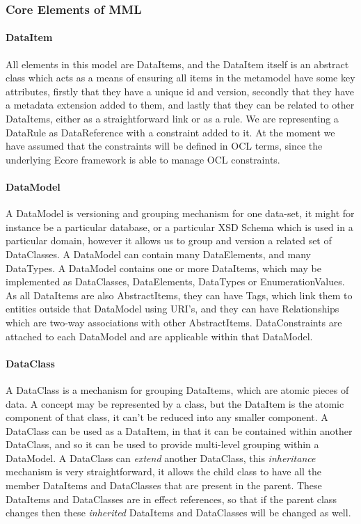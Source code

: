 \documentclass{llncs}
\begin{document}
	\subsubsection{Core Elements of MML}
	
	\paragraph{DataItem}
	All elements in this model are DataItems, and the DataItem itself is an abstract class which acts as a means of ensuring all items in the metamodel have some key attributes, firstly that they have a unique id and version, secondly that they have a metadata extension added to them, and lastly that they can be related to other DataItems, either as a straightforward link or as a rule. We are representing a DataRule as DataReference with a constraint added to it. At the moment we have assumed that the constraints will be defined in OCL terms, since the underlying Ecore framework is able to manage OCL constraints.
	
	\paragraph{DataModel}
	A DataModel is versioning and grouping mechanism for one data-set, it might for instance be a particular database, or a particular XSD Schema which is used in a particular domain, however it allows us to group and version a related set of DataClasses. A DataModel can contain many DataElements, and many DataTypes. A DataModel contains one or more DataItems, which may be implemented as DataClasses, DataElements, DataTypes or EnumerationValues. As all DataItems are also AbstractItems, they can have Tags, which link them to entities outside that DataModel using URI's, and they can have Relationships which are two-way associations with other AbstractItems. DataConstraints are attached to each DataModel and are applicable within that DataModel.
	\paragraph{DataClass}

	A DataClass is a mechanism for grouping DataItems, which are atomic pieces of data. A concept may be represented by a class, but the DataItem is the atomic component of that class, it can't be reduced into any smaller component. A DataClass can be used as a DataItem, in that it can be contained within another DataClass, and so it can be used to provide multi-level grouping within a DataModel. A DataClass can \emph{extend} another DataClass, this \emph{inheritance} mechanism is very straightforward, it allows the child class to have all the member DataItems and DataClasses that are present in the parent. These DataItems and DataClasses are in effect references, so that if the parent class changes then these \emph{inherited} DataItems and DataClasses will be changed as well.
	
\end{document}
